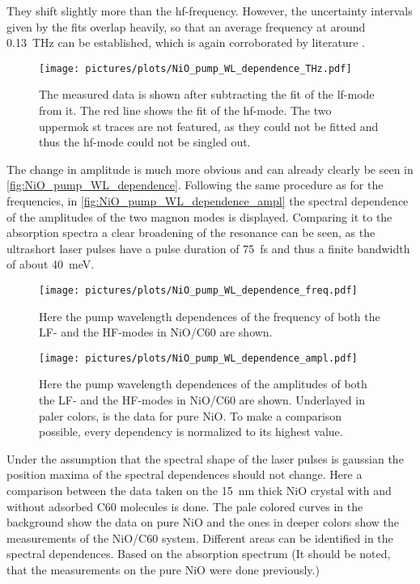 They shift slightly more than the hf-frequency.
However, the uncertainty intervals given by the fits overlap heavily, so that an average frequency at around \qty{0.13}{THz} can be established, which is again corroborated by literature .
\begin{figure}[ht]
    \centering
    \texttt{[image: pictures/plots/NiO\_pump\_WL\_dependence\_THz.pdf]}
    \caption{The measured data is shown after subtracting the fit of the lf-mode from it. The red line shows the fit of the hf-mode. The two uppermok  st traces are not featured, as they could not be fitted and thus the hf-mode could not be singled out.}
    \label{fig:NiO_pump_WL_dependence_THz}
\end{figure}
\FloatBarrier
The change in amplitude is much more obvious and can already clearly be seen in \autoref{fig:NiO_pump_WL_dependence}.
Following the same procedure as for the frequencies, in \autoref{fig:NiO_pump_WL_dependence_ampl} the spectral dependence of the amplitudes of the two magnon modes is displayed.
Comparing it to the absorption spectra a clear broadening of the resonance can be seen, as the ultrashort laser pulses have a pulse duration of \qty{75}{fs} and thus a finite bandwidth of about \qty{40}{meV}.
\begin{figure}[ht]
    \centering
    \texttt{[image: pictures/plots/NiO\_pump\_WL\_dependence\_freq.pdf]}
    \caption{Here the pump wavelength dependences of the frequency of both the LF- and the HF-modes in NiO/C60 are shown.}
    \label{fig:NiO_pump_WL_dependence_freq}
\end{figure}
\begin{figure}[ht]
    \centering
    \texttt{[image: pictures/plots/NiO\_pump\_WL\_dependence\_ampl.pdf]}
    \caption{Here the pump wavelength dependences of the amplitudes of both the LF- and the HF-modes in NiO/C60 are shown. Underlayed in paler colors, is the data for pure NiO. To make a comparison possible, every dependency is normalized to its highest value.}
    \label{fig:NiO_pump_WL_dependence_ampl}
\end{figure}
\FloatBarrier
Under the assumption that the spectral shape of the laser pulses is gaussian the position maxima of the spectral dependences should not change.
Here a comparison between the data taken on the \qty{15}{nm} thick NiO crystal with and without adsorbed C60 molecules is done.
The pale colored curves in the background show the data on pure NiO and the ones in deeper colors show the measurements of the NiO/C60 system.
Different areas can be identified in the spectral dependences.
Based on the absorption spectrum
(It should be noted, that the measurements on the pure NiO were done previously.)\\





